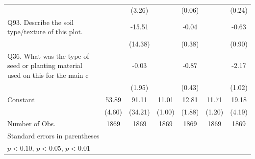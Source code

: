 {\begin{tabular}{l*{6}{c}}
                    &                     &      (3.26)         &                     &      (0.06)         &                     &      (0.24)         \\
[1em]
Q93. Describe the soil type/texture of this  plot.&                     &      -15.51         &                     &       -0.04         &                     &       -0.63         \\
                    &                     &     (14.38)         &                     &      (0.38)         &                     &      (0.90)         \\
[1em]
Q36. What was the type of seed or planting material used on this  for the main c&                     &       -0.03         &                     &       -0.87\sym{**} &                     &       -2.17\sym{**} \\
                    &                     &      (1.95)         &                     &      (0.43)         &                     &      (1.02)         \\
[1em]
Constant            &       53.89\sym{***}&       91.11\sym{***}&       11.01\sym{***}&       12.81\sym{***}&       11.71\sym{***}&       19.18\sym{***}\\
                    &      (4.60)         &     (34.21)         &      (1.00)         &      (1.88)         &      (1.20)         &      (4.19)         \\
\hline
Number of Obs.      &        1869         &        1869         &        1869         &        1869         &        1869         &        1869         \\
\hline\hline
\multicolumn{7}{l}{\footnotesize Standard errors in parentheses}\\
\multicolumn{7}{l}{\footnotesize \sym{*} \(p<0.10\), \sym{**} \(p<0.05\), \sym{***} \(p<0.01\)}\\
\end{tabular}
}
